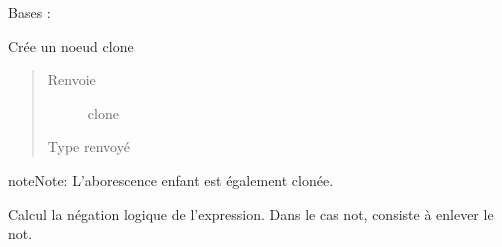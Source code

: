 \documentclass[letterpaper,10pt,french]{sphinxmanual}
\begin{document}
\begin{fulllineitems}
\label{\detokenize{logicexpressionnodes:logicexpressionnodes.NotNode}}
Bases : {\hyperref[\detokenize{logicexpressionnodes:logicexpressionnodes.LogicExpressionNode}]{}}

\begin{fulllineitems}
\label{\detokenize{logicexpressionnodes:logicexpressionnodes.NotNode.clone}}
Crée un noeud clone
\begin{quote}\begin{description}
\item[{Renvoie}] \leavevmode
clone

\item[{Type renvoyé}] \leavevmode
{\hyperref[\detokenize{logicexpressionnodes:logicexpressionnodes.LogicExpressionNode}]{}}

\end{description}\end{quote}

\begin{sphinxadmonition}{note}{Note:}
L’aborescence enfant est également clonée.
\end{sphinxadmonition}

\end{fulllineitems}


\begin{fulllineitems}
\label{\detokenize{logicexpressionnodes:logicexpressionnodes.NotNode.logicNegateClone}}
Calcul la négation logique de l’expression.
Dans le cas not, consiste à enlever le not.


\end{fulllineitems}
\end{fulllineitems}
\end{document}
